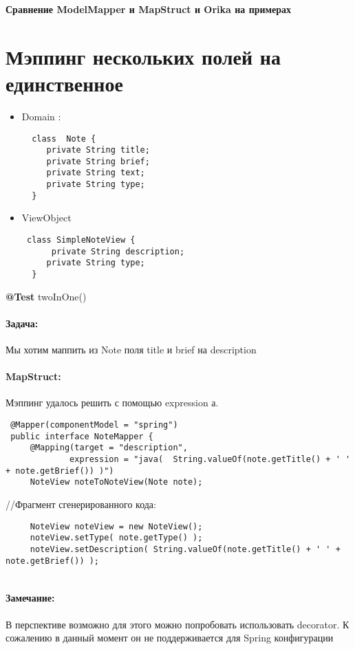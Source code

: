 \documentclass{article}
\date{}
\begin{document}
\centerline{\Large{\bf Сравнение ModelMapper и MapStruct и Orika на примерах }}

\section{Мэппинг нескольких полей на единственное}


 \begin{itemize}
 \item Domain :
 \begin{lstlisting} 
  class  Note {
     private String title;
     private String brief;
     private String text;
     private String type;
  }
  \end{lstlisting}
 \item ViewObject
 \begin{lstlisting} 
 class SimpleNoteView {
      private String description;
     private String type;
  }
  \end{lstlisting}
 \end{itemize}
  \textbf{@Test} twoInOne()
 
 \paragraph{Задача:}
 Мы хотим маппить из Note поля title и brief на description
 
  \paragraph{MapStruct:}
  Мэппинг удалось решить с помощью expression а.  
  
\begin{lstlisting} 
 @Mapper(componentModel = "spring")
 public interface NoteMapper { 
     @Mapping(target = "description",
             expression = "java(  String.valueOf(note.getTitle() + ' ' + note.getBrief()) )")
     NoteView noteToNoteView(Note note);
    \end{lstlisting}
    //Фрагмент сгенерированного кода:
  \begin{lstlisting}   
     NoteView noteView = new NoteView(); 
     noteView.setType( note.getType() );
     noteView.setDescription( String.valueOf(note.getTitle() + ' ' + note.getBrief()) );
 
  \end{lstlisting}
  \paragraph{Замечание: }
    В перспективе возможно для этого можно попробовать использовать decorator. 
    К сожалению в данный момент он не поддерживается для Spring конфигурации
    
\end{document}
